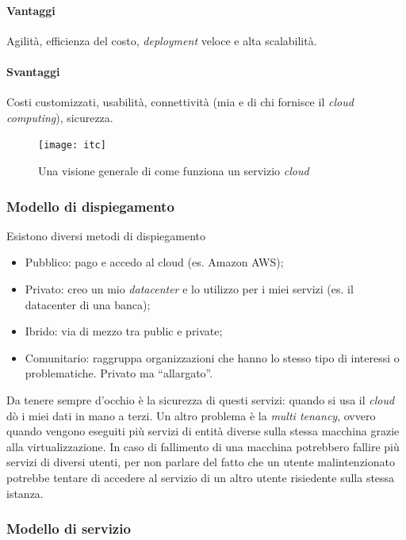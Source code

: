 \paragraph*{Vantaggi} Agilità, efficienza del costo, \textit{deployment} veloce
e alta scalabilità.

\paragraph*{Svantaggi} Costi customizzati, usabilità, connettività (mia e di
chi fornisce il \textit{cloud computing}), sicurezza.


\begin{figure}[H]
 \centering
 \texttt{[image: itc]}
 \caption{Una visione generale di come funziona un servizio \textit{cloud}}
\end{figure}

\subsubsection{Modello di dispiegamento}

Esistono diversi metodi di dispiegamento
\begin{itemize}
  \item Pubblico: pago e accedo al cloud (es. Amazon AWS);
  \item Privato: creo un mio \textit{datacenter} e lo utilizzo per i miei
  servizi (es. il datacenter di una banca);
  \item Ibrido: via di mezzo tra public e private;
  \item Comunitario: raggruppa organizzazioni che hanno lo stesso tipo di
  interessi o problematiche. Privato ma ``allargato''.
\end{itemize}

Da tenere sempre d'occhio è la sicurezza di questi servizi: quando si usa il
\textit{cloud} dò i miei dati in mano a terzi. Un altro problema è la
\textit{multi tenancy}, ovvero quando vengono eseguiti più servizi di entità
diverse sulla stessa macchina grazie alla virtualizzazione. In caso di
fallimento di una macchina potrebbero fallire più servizi di diversi utenti,
per non parlare del fatto che un utente malintenzionato potrebbe tentare di
accedere al servizio di un altro utente risiedente sulla stessa istanza.

\subsubsection{Modello di servizio}

